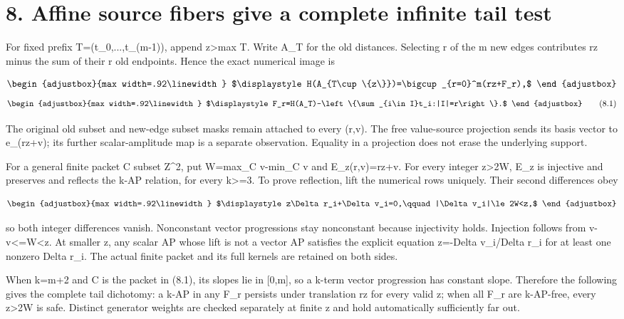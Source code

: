 \section{8. Affine source fibers give a complete infinite tail test}\label{n08-affine-source-fibers-give-a-complete-infinite-tail-test}

For fixed prefix T=(t\_0,...,t\_(m-1)), append z\textgreater max T. Write A\_T for the old distances. Selecting r of the m new edges contributes rz minus the sum of their r old endpoints. Hence the exact numerical image is

\[
\begin{adjustbox}{max width=.92\linewidth}
$\displaystyle H(A_{T\cup\{z\}})=\bigcup_{r=0}^m(rz+F_r),$
\end{adjustbox}
\] \[
\begin{adjustbox}{max width=.92\linewidth}
$\displaystyle F_r=H(A_T)-\left\{\sum_{i\in I}t_i:|I|=r\right\}.$
\end{adjustbox}
\tag{8.1}
\]

The original old subset and new-edge subset masks remain attached to every (r,v). The free value-source projection sends its basis vector to e\_(rz+v); its further scalar-amplitude map is a separate observation. Equality in a projection does not erase the underlying support.

For a general finite packet C subset Z\^{}2, put W=max\_C v-min\_C v and E\_z(r,v)=rz+v. For every integer z\textgreater2W, E\_z is injective and preserves and reflects the k-AP relation, for every k\textgreater=3. To prove reflection, lift the numerical rows uniquely. Their second differences obey

\[
\begin{adjustbox}{max width=.92\linewidth}
$\displaystyle z\Delta r_i+\Delta v_i=0,\qquad |\Delta v_i|\le2W<z,$
\end{adjustbox}
\]

so both integer differences vanish. Nonconstant vector progressions stay nonconstant because injectivity holds. Injection follows from \textbar v-v\textquotesingle\textbar\textless=W\textless z. At smaller z, any scalar AP whose lift is not a vector AP satisfies the explicit equation z=-Delta v\_i/Delta r\_i for at least one nonzero Delta r\_i. The actual finite packet and its full kernels are retained on both sides.

When k=m+2 and C is the packet in (8.1), its slopes lie in {[}0,m{]}, so a k-term vector progression has constant slope. Therefore the following gives the complete tail dichotomy: a k-AP in any F\_r persists under translation rz for every valid z; when all F\_r are k-AP-free, every z\textgreater2W is safe. Distinct generator weights are checked separately at finite z and hold automatically sufficiently far out.

